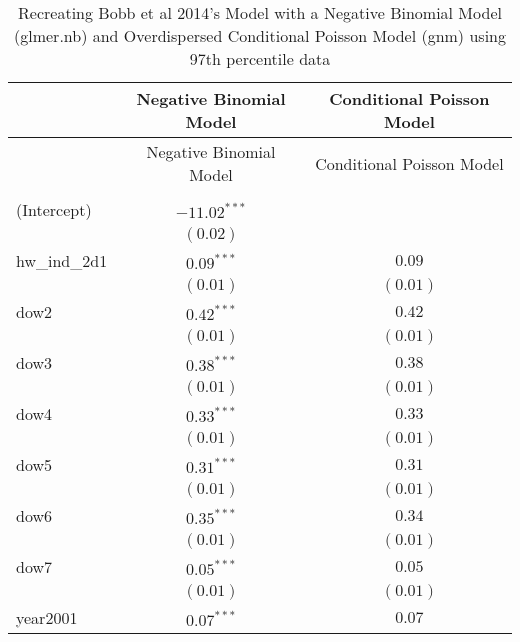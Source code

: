 
\usepackage{longtable}

\begin{center}
\begin{longtable}{l c c}
\caption{Recreating Bobb et al 2014's Model with a Negative Binomial Model (glmer.nb) and Overdispersed Conditional Poisson Model (gnm) using 97th percentile data}
\label{table:coefficients}\\
\hline
 & Negative Binomial Model & Conditional Poisson Model \\
\hline
\endfirsthead
\hline
 & Negative Binomial Model & Conditional Poisson Model \\
\hline
\endhead
\hline
\endfoot
\hline
\multicolumn{3}{l}{\scriptsize{$^{***}p<0.001$; $^{**}p<0.01$; $^{*}p<0.05$}}\\
\endlastfoot
(Intercept)           & $-11.02^{***}$ &                        \\
                      & $(0.02)$       &                        \\
hw\_ind\_2d1          & $0.09^{***}$   & $0.09$                 \\
                      & $(0.01)$       & $(0.01)$               \\
dow2                  & $0.42^{***}$   & $0.42$                 \\
                      & $(0.01)$       & $(0.01)$               \\
dow3                  & $0.38^{***}$   & $0.38$                 \\
                      & $(0.01)$       & $(0.01)$               \\
dow4                  & $0.33^{***}$   & $0.33$                 \\
                      & $(0.01)$       & $(0.01)$               \\
dow5                  & $0.31^{***}$   & $0.31$                 \\
                      & $(0.01)$       & $(0.01)$               \\
dow6                  & $0.35^{***}$   & $0.34$                 \\
                      & $(0.01)$       & $(0.01)$               \\
dow7                  & $0.05^{***}$   & $0.05$                 \\
                      & $(0.01)$       & $(0.01)$               \\
year2001              & $0.07^{***}$   & $0.07$                 \\

\end{longtable}
\end{center}
